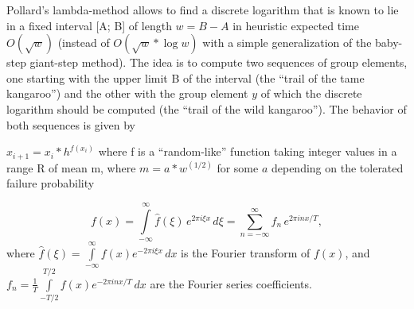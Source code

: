 \documentclass[12pt]{article}
\begin{document}
Pollard’s lambda-method allows to find a discrete logarithm that is known to lie in a fixed interval [A; B] of length  $w=B-A$ in heuristic expected time $O(\sqrt{w})$ (instead of $O(\sqrt{w}*\log{w})$ with a simple generalization of the baby-step giant-step method). The idea is to compute two sequences of group elements, one starting with the upper limit B of the interval (the “trail of the tame kangaroo”) and the other with the group element $y$ of which the discrete logarithm should be computed (the “trail of the wild kangaroo”). The behavior of both sequences is given by


$x_{i+1}=x_i*h^{f(x_i)}$ where f is a “random-like” function taking integer values in a range R of mean m, where $m=a*w^{(1/2)}$ for some $a$ depending on the tolerated failure probability


$$f(x) = \int\limits_{-\infty}^{\infty} \hat{f}(\xi)\,e^{2 \pi i \xi x} \,d\xi = \sum_{n=-\infty}^{\infty} f_n\,e^{2 \pi i n x / T},$$ where $\hat{f}(\xi) = \int\limits_{-\infty}^{\infty} f(x) e^{-2 \pi i \xi x} \,dx$ is the Fourier transform of $f(x)$, and $f_n = \frac{1}{T} \int\limits_{-T/2}^{T/2} f(x) e^{-2 \pi i n x / T} \,dx$ are the Fourier series coefficients.
\end{document}
